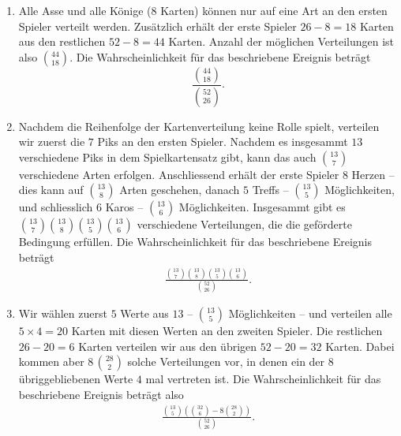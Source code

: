 \begin{enumerate}
    \item Alle Asse und alle Könige ($8$ Karten) können nur auf eine Art an den
        ersten Spieler verteilt werden. Zusätzlich erhält der erste Spieler 
        $26-8=18$ Karten aus den restlichen $52-8=44$ Karten. Anzahl der möglichen
        Verteilungen ist also $\binom{44}{18}$. Die Wahrscheinlichkeit für das 
        beschriebene Ereignis beträgt
        \begin{equation*}
            \frac{\binom{44}{18}}{\binom{52}{26}}.
        \end{equation*}
    \item Nachdem die Reihenfolge der Kartenverteilung keine Rolle spielt,
        verteilen wir zuerst die $7$ Piks an den ersten Spieler. Nachdem es
        insgesammt $13$ verschiedene Piks in dem Spielkartensatz gibt, kann das
        auch $\binom{13}{7}$ verschiedene Arten erfolgen. Anschliessend erhält
        der erste Spieler $8$ Herzen -- dies kann auf $\binom{13}{8}$ Arten
        geschehen, danach $5$ Treffs -- $\binom{13}{5}$ Möglichkeiten, und
        schliesslich $6$ Karos -- $\binom{13}{6}$ Möglichkeiten. Insgesammt
        gibt es $\binom{13}{7} \binom{13}{8} \binom{13}{5} \binom{13}{6}$
        verschiedene Verteilungen, die die geförderte Bedingung erfüllen. Die
        Wahrscheinlichkeit für das beschriebene Ereignis beträgt
        \begin{align*}
            \frac{ \binom{13}{7} \binom{13}{8} \binom{13}{5} \binom{13}{6} }{\binom{52}{26}}.
        \end{align*}
    \item Wir wählen zuerst $5$ Werte aus $13$ -- $\binom{13}{5}$ Möglichkeiten
        -- und verteilen alle $5 \times 4 = 20$ Karten mit diesen Werten an den
        zweiten Spieler. Die restlichen $26 - 20 = 6$ Karten verteilen wir aus
        den übrigen $52-20=32$ Karten. Dabei kommen aber $8\, \binom{28}{2}$
        solche Verteilungen vor, in denen ein der $8$ übriggebliebenen Werte $4$
        mal vertreten ist. Die Wahrscheinlichkeit für das beschriebene Ereignis
        beträgt also
        \begin{align*}
            \frac{\binom{13}{5} \left( \binom{32}{6} - 8 \binom{28}{2} \right)}{\binom{52}{26}}.
        \end{align*}
\end{enumerate}

